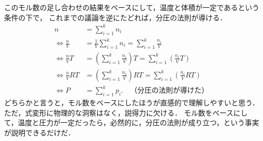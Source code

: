         このモル数の足し合わせの結果をベースにして，温度と体積が一定であるという条件の下で，
        これまでの議論を逆にたどれば，分圧の法則が導ける．
        \begin{align*}
                                        n &= \sum_{i=1}^{k} {n}_{i}\\
            \Leftrightarrow \frac{n}{V}   &= \frac{1}{V}\sum_{i=1}^{k} {n}_{i} = \sum_{i=1}^{k} \frac{{n}_{i}}{V}\\
            \Leftrightarrow \frac{n}{V} T &= \left(\sum_{i=1}^{k} \frac{{n}_{i}}{V}\right)  T = \sum_{i=1}^{k}\left( \frac{{n}_{i}}{V} T\right)\\
            \Leftrightarrow \frac{n}{V}RT &= \left(\sum_{i=1}^{k} \frac{{n}_{i}}{V}\right) RT= \sum_{i=1}^{k}\left( \frac{{n}_{i}}{V}RT\right)  \\
            \Leftrightarrow             P &= \sum_{i=1}^{k} {p}_{i}.\quad\mbox{（分圧の法則が導けた）}\
        \end{align*}
        どちらかと言うと，モル数をベースにしたほうが直感的で理解しやすいと思う．ただ，式変形に物理的な洞察はなく，説得力に欠ける．
        モル数をベースにして，温度と圧力が一定だったら，必然的に，分圧の法則が成り立つ，という事実が説明できるだけだ．



